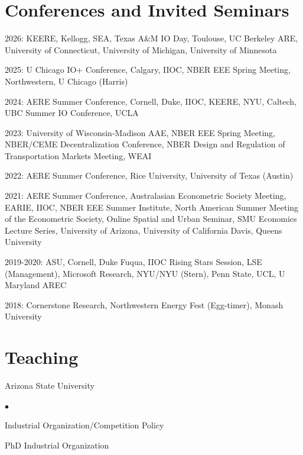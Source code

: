 \documentclass[margin,line]{res}
\newenvironment{list1}{
  \begin{list}{\ding{113}}{%
      \setlength{\itemsep}{.025in}
      \setlength{\parsep}{0in} \setlength{\parskip}{0in}
      \setlength{\topsep}{0in} \setlength{\partopsep}{0in}
      \setlength{\leftmargin}{0.17in}}}{\end{list}}
\newenvironment{list2}{
  \begin{list}{$\bullet$}{%
      \setlength{\itemsep}{0in}
      \setlength{\parsep}{0in} \setlength{\parskip}{0in}
      \setlength{\topsep}{0in} \setlength{\partopsep}{0in}
      \setlength{\leftmargin}{0.2in}}}{\end{list}}
\begin{document}
\begin{resume}
\section{ Conferences and Invited Seminars}
\begin{list1}
\item[] 2026: KEERE, Kellogg, SEA, Texas A\&M IO Day, Toulouse, UC Berkeley ARE, University of Connecticut, University of Michigan, University of Minnesota
\item[] 2025: U Chicago IO+ Conference, Calgary, IIOC, NBER EEE Spring Meeting, Northwestern, U Chicago (Harris)
\item[] 2024: AERE Summer Conference, Cornell, Duke, IIOC, KEERE, NYU, Caltech, UBC Summer IO Conference, UCLA
\item[] 2023: University of Wisconsin-Madison AAE, NBER EEE Spring Meeting, NBER/CEME Decentralization Conference, NBER Design and Regulation of Transportation Markets Meeting, WEAI
\item[] 2022: AERE Summer Conference, Rice University, University of Texas (Austin)
\item[] 2021: AERE Summer Conference, Australasian Econometric Society Meeting, EARIE, IIOC, NBER EEE Summer Institute, North American Summer Meeting of the Econometric Society, Online Spatial and Urban Seminar, SMU Economics Lecture Series, University of Arizona, University of California Davis, Queens University
\item[] 2019-2020: ASU, Cornell, Duke Fuqua, IIOC Rising Stars Session, LSE (Management), Microsoft Research, NYU/NYU (Stern), Penn State, UCL, U Maryland AREC
\item[] 2018:  Cornerstone Research, Northwestern Energy Fest (Egg-timer), Monash University
\end{list1}

\section{Teaching}
\begin{list1}
	\item[] Arizona State University
	\begin{list2}
		\item[] Industrial Organization/Competition Policy 
		\item[] PhD Industrial Organization 
	\end{list2}
\end{list1}


\end{resume}
\end{document}
